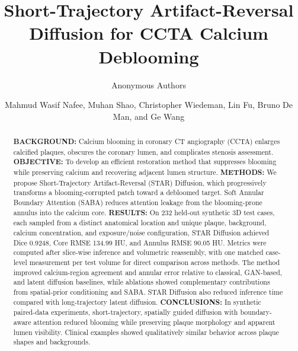 \documentclass[singleLetter,times]{sagej}
\begin{document}
\title{Short-Trajectory Artifact-Reversal Diffusion for CCTA Calcium Deblooming}

\ifdefined\blinded
\author{Anonymous Authors}
\else
\author{Mahmud Wasif Nafee, Muhan Shao, Christopher Wiedeman, Lin Fu, Bruno De Man, and Ge Wang}
\fi

\begin{abstract}
\textbf{BACKGROUND:} Calcium blooming in coronary CT angiography (CCTA) enlarges calcified plaques, obscures the coronary lumen, and complicates stenosis assessment. \textbf{OBJECTIVE:} To develop an efficient restoration method that suppresses blooming while preserving calcium and recovering adjacent lumen structure. \textbf{METHODS:} We propose Short-Trajectory Artifact-Reversal (STAR) Diffusion, which progressively transforms a blooming-corrupted patch toward a debloomed target. Soft Annular Boundary Attention (SABA) reduces attention leakage from the blooming-prone annulus into the calcium core. \textbf{RESULTS:} On 232 held-out synthetic 3D test cases, each sampled from a distinct anatomical location and unique plaque, background, calcium concentration, and exposure/noise configuration, STAR Diffusion achieved Dice 0.9248, Core RMSE 134.99 HU, and Annulus RMSE 90.05 HU. Metrics were computed after slice-wise inference and volumetric reassembly, with one matched case-level measurement per test volume for direct comparison across methods. The method improved calcium-region agreement and annular error relative to classical, GAN-based, and latent diffusion baselines, while ablations showed complementary contributions from spatial-prior conditioning and SABA. STAR Diffusion also reduced inference time compared with long-trajectory latent diffusion. \textbf{CONCLUSIONS:} In synthetic paired-data experiments, short-trajectory, spatially guided diffusion with boundary-aware attention reduced blooming while preserving plaque morphology and apparent lumen visibility. Clinical examples showed qualitatively similar behavior across plaque shapes and backgrounds.
\end{abstract}
\end{document}
